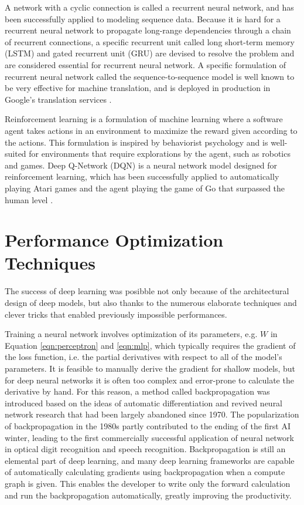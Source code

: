 A network with a cyclic connection is called a recurrent neural network, and has been successfully applied to modeling sequence data.
Because it is hard for a recurrent neural network to propagate long-range dependencies through a chain of recurrent connections, a specific recurrent unit called long short-term memory (LSTM) \cite{hochreiter1997lstm} and gated recurrent unit (GRU) \cite{cho2014seq2seq} are devised to resolve the problem and are considered essential for recurrent neural network.
A specific formulation of recurrent neural network called the sequence-to-sequence model \cite{cho2014seq2seq,sutskever2014seq2seq} is well known to be very effective for machine translation, and is deployed in production in Google's translation services \cite{wu2016google}.

Reinforcement learning \cite{sutton2018reinforcement} is a formulation of machine learning where a software agent takes actions in an environment to maximize the reward given according to the actions.
This formulation is inspired by behaviorist psychology and is well-suited for environments that require explorations by the agent, such as robotics and games.
Deep Q-Network (DQN) \cite{mnih2015dqn} is a neural network model designed for reinforcement learning, which has been successfully applied to automatically playing Atari games \cite{mnih2013atari} and the agent playing the game of Go that surpassed the human level \cite{silver2016alphago}.

\section{Performance Optimization Techniques}

The success of deep learning was posibble not only because of the architectural design of deep models, but also thanks to the numerous elaborate techniques and clever tricks that enabled previously impossible performances.

Training a neural network involves optimization of its parameters, e.g. $W$ in Equation \ref{eqn:perceptron} and \ref{eqn:mlp}, which typically requires the gradient of the loss function, i.e. the partial derivatives with respect to all of the model's parameters.
It is feasible to manually derive the gradient for shallow models, but for deep neural networks it is often too complex and error-prone to calculate the derivative by hand.
For this reason, a method called backpropagation \cite{werbos1982backpropagation, rumelhart1986backpropagation} was introduced based on the ideas of automatic differentiation \cite{linnainmaa1970ad} and revived neural network research that had been largely abandoned since 1970.
The popularization of backpropagation in the 1980s partly contributed to the ending of the first AI winter, leading to the first commercially successful application of neural network in optical digit recognition and speech recognition.
Backpropagation is still an elemental part of deep learning, and many deep learning frameworks are capable of automatically calculating gradients using backpropagation when a compute graph is given.
This enables the developer to write only the forward calculation and run the backpropagation automatically, greatly improving the productivity.

